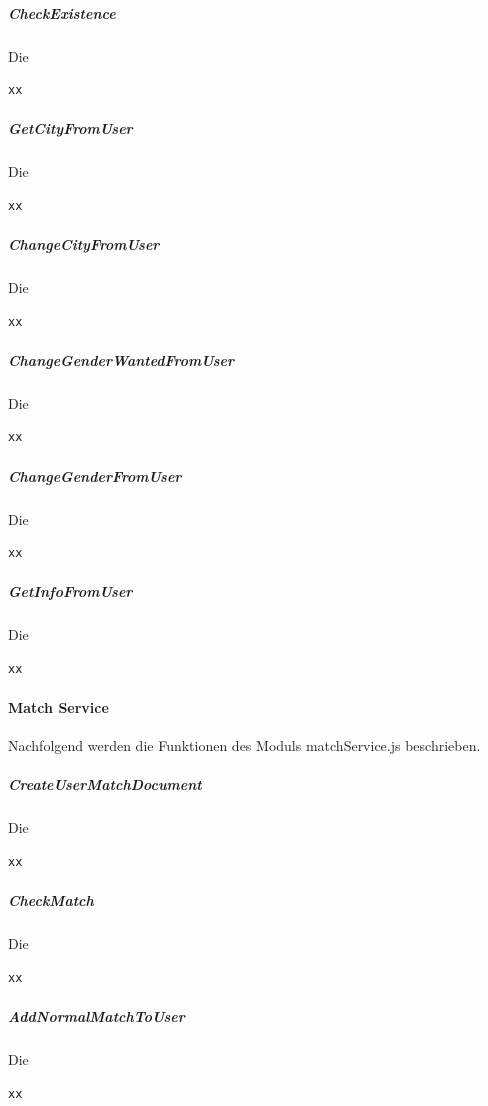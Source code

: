 \subparagraph{CheckExistence}
Die

\begin{lstlisting}[caption=TODO, label=lst:TODO]
xx
\end{lstlisting}

\subparagraph{GetCityFromUser}
Die

\begin{lstlisting}[caption=TODO, label=lst:TODO]
xx
\end{lstlisting}

\subparagraph{ChangeCityFromUser}
Die

\begin{lstlisting}[caption=TODO, label=lst:TODO]
xx
\end{lstlisting}

\subparagraph{ChangeGenderWantedFromUser}
Die

\begin{lstlisting}[caption=TODO, label=lst:TODO]
xx
\end{lstlisting}

\subparagraph{ChangeGenderFromUser}
Die

\begin{lstlisting}[caption=TODO, label=lst:TODO]
xx
\end{lstlisting}

\subparagraph{GetInfoFromUser}
Die

\begin{lstlisting}[caption=TODO, label=lst:TODO]
xx
\end{lstlisting}

\paragraph{Match Service}
Nachfolgend werden die Funktionen des Moduls 
matchService.js beschrieben.

\subparagraph{CreateUserMatchDocument}
Die

\begin{lstlisting}[caption=TODO, label=lst:TODO]
xx
\end{lstlisting}

\subparagraph{CheckMatch}
Die

\begin{lstlisting}[caption=TODO, label=lst:TODO]
xx
\end{lstlisting}

\subparagraph{AddNormalMatchToUser}
Die

\begin{lstlisting}[caption=TODO, label=lst:TODO]
xx
\end{lstlisting}

